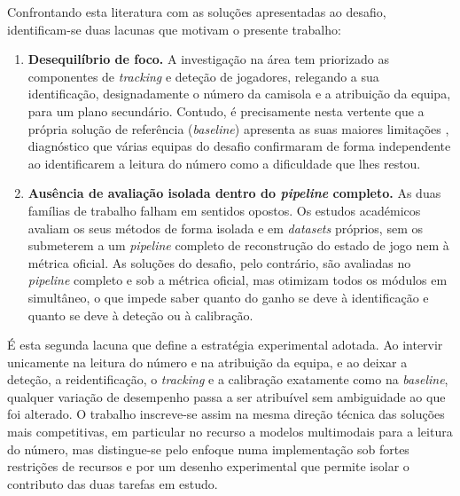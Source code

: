 Confrontando esta literatura com as soluções apresentadas ao desafio, identificam-se duas
lacunas que motivam o presente trabalho:

\begin{enumerate}
    \item \textbf{Desequilíbrio de foco.} A investigação na área tem priorizado as
    componentes de \emph{tracking} e deteção de jogadores, relegando a sua identificação,
    designadamente o número da camisola e a atribuição da equipa, para um plano
    secundário. Contudo, é precisamente nesta vertente que a própria solução de referência
    (\emph{baseline}) apresenta as suas maiores limitações \citep{somers2024soccernet},
    diagnóstico que várias equipas do desafio confirmaram de forma independente ao
    identificarem a leitura do número como a dificuldade que lhes restou.

    \item \textbf{Ausência de avaliação isolada dentro do \emph{pipeline} completo.} As
    duas famílias de trabalho falham em sentidos opostos. Os estudos académicos avaliam os
    seus métodos de forma isolada e em \emph{datasets} próprios, sem os submeterem a um
    \emph{pipeline} completo de reconstrução do estado de jogo nem à métrica oficial. As
    soluções do desafio, pelo contrário, são avaliadas no \emph{pipeline} completo e sob a
    métrica oficial, mas otimizam todos os módulos em simultâneo, o que impede saber quanto
    do ganho se deve à identificação e quanto se deve à deteção ou à calibração.
\end{enumerate}

É esta segunda lacuna que define a estratégia experimental adotada. Ao intervir unicamente
na leitura do número e na atribuição da equipa, e ao deixar a deteção, a reidentificação, o
\emph{tracking} e a calibração exatamente como na \emph{baseline}, qualquer variação de
desempenho passa a ser atribuível sem ambiguidade ao que foi alterado. O trabalho
inscreve-se assim na mesma direção técnica das soluções mais competitivas, em particular no
recurso a modelos multimodais para a leitura do número, mas distingue-se pelo enfoque numa
implementação sob fortes restrições de recursos e por um desenho experimental que permite
isolar o contributo das duas tarefas em estudo.
